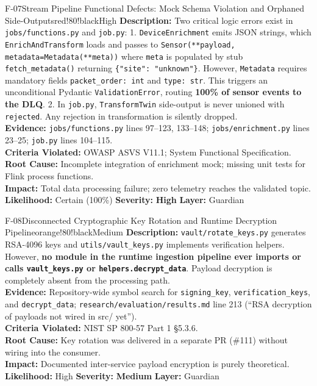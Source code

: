 \documentclass[10pt,a4paper]{report}
\begin{document}
\begin{findingbox}{F-07}{Stream Pipeline Functional Defects: Mock Schema Violation and Orphaned Side-Outputs}{red!80!black}{High}
\textbf{Description:} Two critical logic errors exist in \texttt{jobs/functions.py} and \texttt{job.py}:
1. \texttt{DeviceEnrichment} emits JSON strings, which \texttt{EnrichAndTransform} loads and passes to \texttt{Sensor(**payload, metadata=Metadata(**meta))} where \texttt{meta} is populated by stub \texttt{fetch\_metadata()} returning \texttt{\{"site": "unknown"\}}. However, \texttt{Metadata} requires mandatory fields \texttt{packet\_order: int} and \texttt{type: str}. This triggers an unconditional Pydantic \texttt{ValidationError}, routing \textbf{100\% of sensor events to the DLQ}.
2. In \texttt{job.py}, \texttt{TransformTwin} side-output is never unioned with \texttt{rejected}. Any rejection in transformation is silently dropped.\\
\textbf{Evidence:} \texttt{jobs/functions.py} lines 97--123, 133--148; \texttt{jobs/enrichment.py} lines 23--25; \texttt{job.py} lines 104--115.\\
\textbf{Criteria Violated:} OWASP ASVS V11.1; System Functional Specification.\\
\textbf{Root Cause:} Incomplete integration of enrichment mock; missing unit tests for Flink process functions.\\
\textbf{Impact:} Total data processing failure; zero telemetry reaches the validated topic.\\
\textbf{Likelihood:} Certain (100\%) \quad \textbar \quad \textbf{Severity:} \textbf{High} \quad \textbar \quad \textbf{Layer:} Guardian
\end{findingbox}

\begin{findingbox}{F-08}{Disconnected Cryptographic Key Rotation and Runtime Decryption Pipeline}{orange!80!black}{Medium}
\textbf{Description:} \texttt{vault/rotate\_keys.py} generates RSA-4096 keys and \texttt{utils/vault\_keys.py} implements verification helpers. However, \textbf{no module in the runtime ingestion pipeline ever imports or calls \texttt{vault\_keys.py} or \texttt{helpers.decrypt\_data}}. Payload decryption is completely absent from the processing path.\\
\textbf{Evidence:} Repository-wide symbol search for \texttt{signing\_key}, \texttt{verification\_keys}, and \texttt{decrypt\_data}; \texttt{research/evaluation/results.md} line 213 (``RSA decryption of payloads not wired in src/ yet'').\\
\textbf{Criteria Violated:} NIST SP 800-57 Part 1 §5.3.6.\\
\textbf{Root Cause:} Key rotation was delivered in a separate PR (\#111) without wiring into the consumer.\\
\textbf{Impact:} Documented inter-service payload encryption is purely theoretical.\\
\textbf{Likelihood:} High \quad \textbar \quad \textbf{Severity:} \textbf{Medium} \quad \textbar \quad \textbf{Layer:} Guardian
\end{findingbox}
\end{document}

